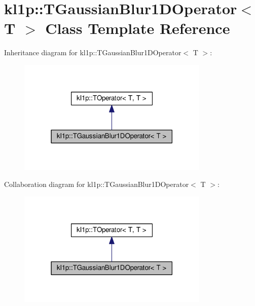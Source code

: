 \hypertarget{classkl1p_1_1TGaussianBlur1DOperator}{}\section{kl1p\+:\+:T\+Gaussian\+Blur1\+D\+Operator$<$ T $>$ Class Template Reference}
\label{classkl1p_1_1TGaussianBlur1DOperator}


Inheritance diagram for kl1p\+:\+:T\+Gaussian\+Blur1\+D\+Operator$<$ T $>$\+:
\nopagebreak
\begin{figure}[H]
\begin{center}
\leavevmode
\includegraphics[width=259pt]{classkl1p_1_1TGaussianBlur1DOperator__inherit__graph}
\end{center}
\end{figure}


Collaboration diagram for kl1p\+:\+:T\+Gaussian\+Blur1\+D\+Operator$<$ T $>$\+:
\nopagebreak
\begin{figure}[H]
\begin{center}
\leavevmode
\includegraphics[width=259pt]{classkl1p_1_1TGaussianBlur1DOperator__coll__graph}
\end{center}
\end{figure}
